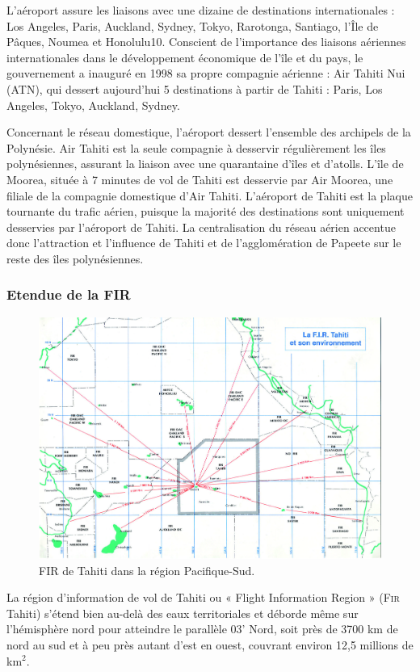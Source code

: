 L’aéroport assure les liaisons avec une dizaine de destinations internationales : Los Angeles, Paris, Auckland, Sydney, Tokyo, Rarotonga, Santiago, l’Île de Pâques, Noumea et Honolulu10. Conscient de l’importance des liaisons aériennes internationales dans le développement économique de l’île et du pays, le gouvernement a inauguré en 1998 sa propre compagnie aérienne : Air Tahiti Nui (ATN), qui dessert aujourd’hui 5 destinations à partir de Tahiti : Paris, Los Angeles, Tokyo, Auckland, Sydney.

Concernant le réseau domestique, l’aéroport dessert l’ensemble des archipels de la Polynésie. Air Tahiti est la seule compagnie à desservir régulièrement les îles polynésiennes, assurant la liaison avec une quarantaine d’îles et d’atolls. L’île de Moorea, située à 7 minutes de vol de Tahiti est desservie par Air Moorea, une filiale de la compagnie domestique d’Air Tahiti. L’aéroport de Tahiti est la plaque tournante du trafic aérien, puisque la majorité des destinations sont uniquement desservies par l’aéroport de Tahiti. La centralisation du réseau aérien accentue donc l’attraction et l’influence de Tahiti et de l’agglomération de Papeete sur le reste des îles polynésiennes.

        \subsubsection{Etendue de la \textsc{FIR}\label{Fir}}
\begin{figure}[!h]
\center
\includegraphics[width=15cm]{images/fir.png}
\caption{FIR de Tahiti dans la région Pacifique-Sud.}
\label{stats}
\end{figure}
La région d'information de vol de Tahiti ou « Flight Information Region » (\textsc{Fir} Tahiti) s'étend bien au-delà des eaux territoriales et déborde même sur l'hémisphère nord pour atteindre le parallèle 03' Nord, soit près de 3700 km de nord au sud et à peu près autant d'est en ouest, couvrant environ 12,5 millions de km$^2$.

